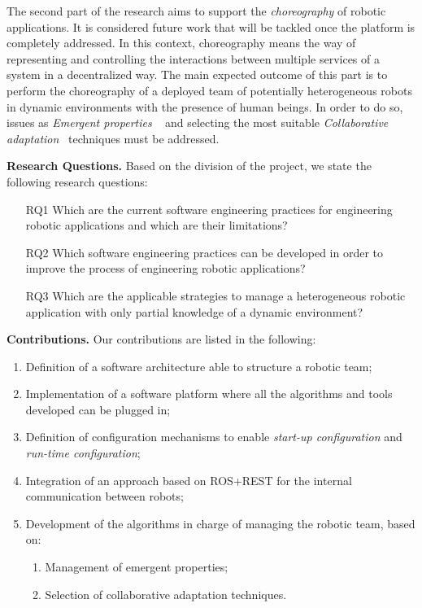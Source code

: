 The second part of the research aims to support the \emph{choreography} of robotic applications.
It is considered future work that will be tackled once the platform is completely addressed.
In this context, choreography means the way of representing and controlling the interactions between multiple services of a system in a decentralized way.
The main expected outcome of this part is to perform the choreography of a deployed team of potentially heterogeneous robots in dynamic environments with the presence of human beings.
In order to do so, issues as \emph{Emergent properties} ~\cite{DeAngelis2015,DeAngelis2016} and selecting the most suitable \emph{Collaborative adaptation}~\cite{Yan2013} techniques must be addressed.

\textbf{Research Questions.} 
Based on the division of the project, we state the following research questions:
\begin{itemize}
\item[RQ1] Which are the current software engineering practices for engineering robotic applications and which are their limitations?
\item[RQ2] Which software engineering practices can be developed in order to improve the process of engineering robotic applications?
\item[RQ3] Which are the applicable strategies to manage a heterogeneous robotic application with only partial knowledge of a dynamic environment?
\end{itemize}

\textbf{Contributions.} 
Our contributions are listed in the following:

\begin{enumerate}
\item Definition of a software architecture able to structure a robotic team;
\item Implementation of a software platform where all the algorithms and tools developed can be plugged in;
\item Definition of configuration mechanisms to enable \emph{start-up configuration} and \emph{run-time configuration};
\item Integration of an approach based on ROS+REST for the internal communication between robots;
\item Development of the algorithms in charge of managing the robotic team, based on:
\begin{enumerate}
\item Management of emergent properties;
\item Selection of collaborative adaptation techniques.
\end{enumerate}
\end{enumerate}

